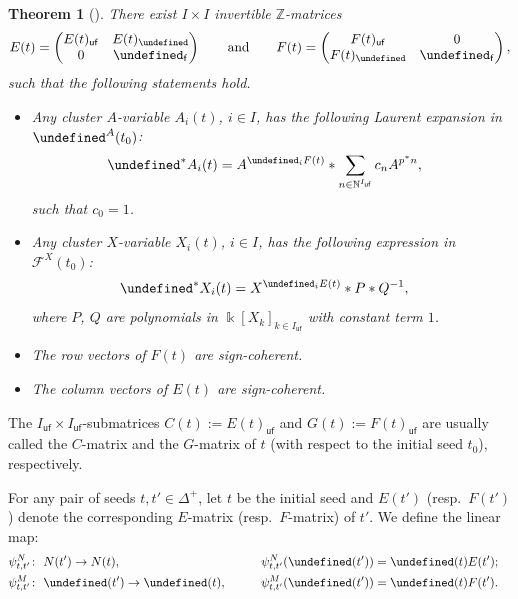 \documentclass[10pt,a4paper]{amsart}
\newcommand{\kk}{\Bbbk}
\newcommand{\Z}{\mathbb{Z}}
\newcommand{\N}{\mathbb{N}}
\newcommand{\opname}[1]{\operatorname{\mathsf{#1}}}
\newcommand{\cF}{{\mathcal F}}
\newcommand{\fv}{\opname{f}}
\newcommand{\ufv}{\opname{uf}}
\let\Mc\undefined
\let\LP\undefined
\let\Id\undefined
\let\col\undefined
\let\seq\undefined
\let\ee\undefined
\let\ff\undefined
\let\uee\undefined
\let\uff\undefined
\let\high\undefined
\let\low\undefined
\newcommand{\Mc}{M^\circ}
\newcommand{\LP}{{\mathcal{LP}}}
\newcommand{\Id}{{\opname{Id}}}
\newcommand{\col}{\opname{col}}
\newcommand{\seq}{\boldsymbol{\mu}}%
\newcommand{\ee}{\mathbf{e}}
\newcommand{\ff}{\mathbf{f}}
\newcommand{\uee}{\underline{\ee}}
\newcommand{\uff}{\underline{\ff}}
\newcommand{\high}{\opname{\ufv,\fv}}
\newcommand{\low}{\opname{\fv,\ufv}}
\numberwithin{equation}{section}
\newtheorem{Theorem}{Theorem}[section]
\begin{document}
\begin{Theorem}[{\cite{DerksenWeymanZelevinsky09,gross2018canonical,Tran09}}]\label{thm:cluster_expansion}
There exist $I\times I$ invertible $\Z$-matrices \[E(t)=\left(\begin{matrix}
E(t)_{\ufv} & E(t)_{\high}\\
0 & \Id_{\fv}
\end{matrix}\right)\qquad \text{and}\qquad F(t)=\left(\begin{matrix}
F(t)_{\ufv} & 0\\
F(t)_{\low} & \Id_{\fv}
\end{matrix}\right),\] such that the following statements hold.
\begin{itemize}\itemsep=0pt
\item[$(1)$] Any cluster $A$-variable $A_{i}(t)$, $i\in I$, has the following
Laurent expansion in $\LP^{A}(t_{0})$:
\begin{align*}
\seq^{*}A_{i}(t) & =A^{\col_{i}F(t)}*\sum_{n\in\N^{I_{\ufv}}}c_{n}A^{p^{*}n},
\end{align*}
such that $c_{0}=1$.

\item[$(2)$] Any cluster $X$-variable $X_{i}(t)$, $i\in I$, has the following
expression in $\cF^{X}(t_{0})$:
\begin{align*}
\seq^{*}X_{i}(t) & =X^{\col_{i}E(t)}*P*Q^{-1},
\end{align*}
where $P$, $Q$ are polynomials in $\kk[X_{k}]_{k\in I_{\ufv}}$ with
constant term $1$.

\item[$(3)$] The row vectors of $F(t)$ are sign-coherent.

\item[$(4)$] The column vectors of $E(t)$ are sign-coherent.
\end{itemize}
\end{Theorem}

The $I_{\ufv}\times I_{\ufv}$-submatrices $C(t):=E(t)_{\ufv}$ and
$G(t):=F(t)_{\ufv}$ are usually called the $C$-matrix and the $G$-matrix
of $t$ (with respect to the initial seed $t_{0}$), respectively.

\begin{Definition}
For any pair of seeds $t,t'\in\Delta^{+}$, let $t$ be the
initial seed and $E(t')$ (resp.~$F(t')$) denote the corresponding
$E$-matrix (resp.\ $F$-matrix) of $t'$. We define the linear map:
\begin{alignat*}{3}
& \psi_{t,t'}^{N}\colon\ N(t')\rightarrow N(t),\qquad&& \psi_{t,t'}^{N}(\uee(t'))=\uee(t)E(t');&\\
& \psi_{t,t'}^{M}\colon\ \Mc(t')\rightarrow\Mc(t),\qquad&& \psi_{t,t'}^{M}(\uff(t'))=\uff(t)F(t').&
\end{alignat*}
\end{Definition}
\end{document}
